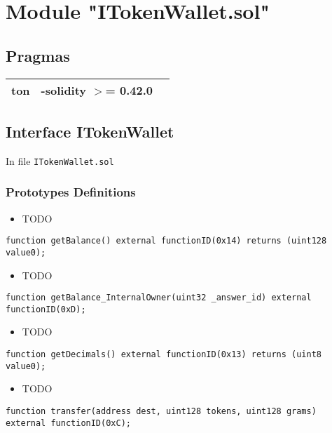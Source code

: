 
\section{Module "ITokenWallet.sol"}


\subsection{Pragmas}


\noindent\begin{tabular}{|l|l|p{5cm}|}\hline
ton & -solidity $>$= 0.42.0 &\\\hline
\end{tabular}


\subsection{Interface ITokenWallet}

\minitoc

In file {\tt ITokenWallet.sol}

\subsubsection{Prototypes Definitions}

\begin{itemize}
\item TODO
\end{itemize}

\begin{lstlisting}[firstnumber=6]
    function getBalance() external functionID(0x14) returns (uint128 value0);
\end{lstlisting}
\begin{itemize}
\item TODO
\end{itemize}

\begin{lstlisting}[firstnumber=4]
    function getBalance_InternalOwner(uint32 _answer_id) external functionID(0xD);
\end{lstlisting}
\begin{itemize}
\item TODO
\end{itemize}

\begin{lstlisting}[firstnumber=7]
    function getDecimals() external functionID(0x13) returns (uint8 value0);
\end{lstlisting}
\begin{itemize}
\item TODO
\end{itemize}

\begin{lstlisting}[firstnumber=5]
    function transfer(address dest, uint128 tokens, uint128 grams) external functionID(0xC);
\end{lstlisting}
